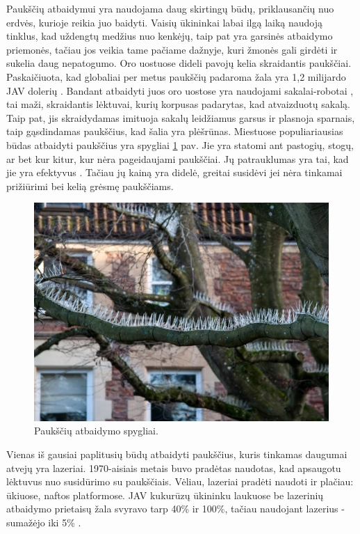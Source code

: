 \documentclass{VUMIFPSkursinis}
\begin{document}
Paukščių atbaidymui yra naudojama daug skirtingų būdų, priklausančių nuo erdvės, kurioje reikia juo baidyti. Vaisių ūkininkai labai ilgą laiką naudoją tinklus, kad uždengtų medžius nuo kenkėjų, taip pat yra garsinės atbaidymo priemonės, tačiau jos veikia tame pačiame dažnyje, kuri žmonės gali girdėti ir sukelia daug nepatogumo. Oro uostuose dideli pavojų kelia skraidantis paukščiai. Paskaičiuota, kad globaliai per metus paukščių padaroma žala yra 1,2 milijardo JAV dolerių \cite{allan2000costs}. Bandant atbaidyti juos oro uostose yra naudojami sakalai-robotai \cite{robird}, tai maži, skraidantis lėktuvai, kurių korpusas padarytas, kad atvaizduotų sakalą. Taip pat, jis skraidydamas imituoja sakalų leidžiamus garsus ir plasnoja sparnais, taip gąsdindamas paukščius, kad šalia yra plėšrūnas. Miestuose populiariausias būdas atbaidyti paukščius yra spygliai \ref{img:bird_spikes} pav. Jie yra statomi ant pastogių, stogų, ar bet kur kitur, kur nėra pageidaujami paukščiai. Jų patrauklumas yra tai, kad jie yra efektyvus \cite{bird_spike}. Tačiau jų kainą yra didelė, greitai susidėvi jei nėra tinkamai prižiūrimi bei kelią grėsmę paukščiams. 

\begin{figure}[H]
    \centering
    \includegraphics[scale=0.3]{img/bird_spikes.png}
    \caption{Paukščių atbaidymo spygliai.}
    \label{img:bird_spikes}
\end{figure}

Vienas iš gausiai paplitusių būdų atbaidyti paukščius, kuris tinkamas daugumai atvejų yra lazeriai. 1970-aisiais metais buvo pradėtas naudotas, kad apsaugotu lėktuvus nuo susidūrimo su paukščiais. Vėliau, lazeriai pradėti naudoti ir plačiau: ūkiuose, naftos platformose. JAV kukurūzų ūkininku laukuose be lazerinių atbaidymo prietaisų žala svyravo tarp 40\% ir 100\%, tačiau naudojant lazerius - sumažėjo iki 5\% \cite{brown2017laser}.
\end{document}
